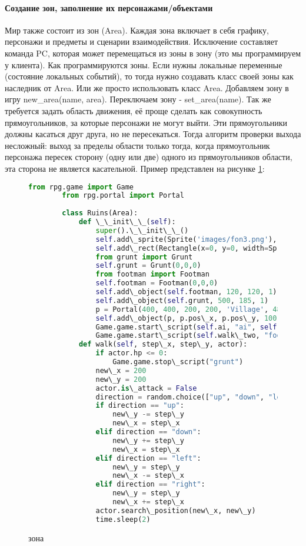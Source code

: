 \paragraph{Создание зон, заполнение их персонажами/объектами}
Мир также состоит из зон (Area). Каждая зона включает в себя графику, персонажи и предметы и сценарии взаимодействия. Исключение составляет команда PC, которая может перемещаться из зоны в зону (это мы программируем у клиента). Как программируются зоны. Если нужны локальные переменные (состояние локальных событий), то тогда нужно создавать класс своей зоны как наследник от Area. Или же просто использовать класс Area. Добавляем зону в игру new\_area(name, area). Переключаем зону - set\_area(name). Так же требуется задать область движения, её проще сделать как совокупность прямоугольников, за которые персонажи не могут выйти. Эти прямоугольники должны касаться друг друга, но не пересекаться. Тогда алгоритм проверки выхода несложный: выход за пределы области только тогда, когда прямоугольник персонажа пересек сторону (одну или две) одного из прямоугольников области, эта сторона не является касательной.
Пример представлен на рисунке \ref{area:image}:
\begin{figure}[H]
	\begin{lstlisting}[language=Python]
		from rpg.game import Game
		from rpg.portal import Portal
		
		class Ruins(Area):
			def \_\_init\_\_(self):
				super().\_\_init\_\_()
				self.add\_sprite(Sprite('images/fon3.png'), 590, 400, 0)
				self.add\_rect(Rectangle(x=0, y=0, width=Sprite('images/fon3.png').image.width(),\\ height=Sprite('images/fon3.png').image.height()))
				from grunt import Grunt
				self.grunt = Grunt(0,0,0)
				from footman import Footman
				self.footman = Footman(0,0,0)
				self.add\_object(self.footman, 120, 120, 1)
				self.add\_object(self.grunt, 500, 185, 1)
				p = Portal(400, 400, 200, 200, 'Village', 480, 100)
				self.add\_object(p, p.pos\_x, p.pos\_y, 100)
				Game.game.start\_script(self.ai, "ai", self.grunt)
				Game.game.start\_script(self.walk\_two, "footman", 50, 50)		
			def walk(self, step\_x, step\_y, actor):
				if actor.hp <= 0:
					Game.game.stop\_script("grunt")
				new\_x = 200
				new\_y = 200
				actor.is\_attack = False
				direction = random.choice(["up", "down", "left", "right"])
				if direction == "up":
					new\_y -= step\_y
					new\_x = step\_x
				elif direction == "down":
					new\_y += step\_y
					new\_x = step\_x
				elif direction == "left":
					new\_y = step\_y
					new\_x -= step\_x
				elif direction == "right":
					new\_y = step\_y
					new\_x += step\_x		
				actor.search\_position(new\_x, new\_y)
				time.sleep(2)
	\end{lstlisting}  
\caption{зона}
\label{area:image}
\end{figure}

